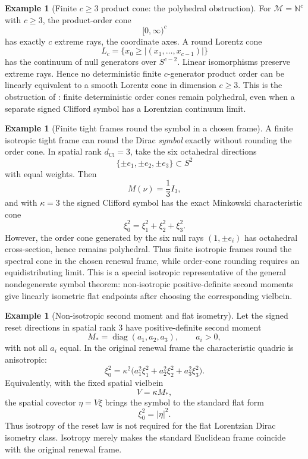 \documentclass[11pt]{article}
\theoremstyle{definition}
\newtheorem{example}[theorem]{Example}
\theoremstyle{remark}
\newcommand{\N}{\mathbb{N}}
\newcommand{\M}{\mathcal{M}}
\newcommand{\dCl}{d_{\mathrm{Cl}}}
\begin{document}
\begin{example}[Finite \(c\ge3\) product cone: the polyhedral obstruction]
\label{ex:finite-cone}
For \(\M=\N^{c}\) with \(c\ge3\), the product-order cone
\[
  [0,\infty)^c
\]
has exactly \(c\) extreme rays, the coordinate axes.  A round Lorentz cone
\[
  L_c=\{x_0\ge |(x_1,\dots,x_{c-1})|\}
\]
has the continuum of null generators over \(S^{c-2}\).  Linear isomorphisms
preserve extreme rays.  Hence no deterministic finite \(c\)-generator product
order can be linearly equivalent to a smooth Lorentz cone in dimension
\(c\ge3\).  This is the obstruction of : finite
deterministic order cones remain polyhedral, even when a separate signed
Clifford symbol has a Lorentzian continuum limit.
\end{example}

\begin{example}[Finite tight frames round the symbol in a chosen frame]
\label{ex:finite-frame-symbol}
A finite isotropic tight frame can round the Dirac \emph{symbol} exactly without
rounding the order cone.  In spatial rank \(\dCl=3\), take the six octahedral
directions
\[
  \{\pm e_1,\pm e_2,\pm e_3\}\subset S^2
\]
with equal weights.  Then
\[
  M(\nu)=\frac13 I_3 ,
\]
and with \(\kappa=3\) the signed Clifford symbol has the exact Minkowski
characteristic cone
\[
  \xi_0^2=\xi_1^2+\xi_2^2+\xi_3^2 .
\]
However, the order cone generated by the six null rays \((1,\pm e_i)\) has
octahedral cross-section, hence remains polyhedral.  Thus finite isotropic
frames round the spectral cone in the chosen renewal frame, while order-cone
rounding requires an equidistributing limit.  This is a special isotropic
representative of the general nondegenerate symbol theorem: non-isotropic
positive-definite second moments give linearly isometric flat endpoints after
choosing the corresponding vielbein.
\end{example}

\begin{example}[Non-isotropic second moment and flat isometry]
\label{ex:anisotropic-frame-equivalence}
Let the signed reset directions in spatial rank \(3\) have positive-definite
second moment
\[
  M_*=\operatorname{diag}(a_1,a_2,a_3),
  \qquad a_i>0,
\]
with not all \(a_i\) equal.  In the original renewal frame the characteristic
quadric is anisotropic:
\[
  \xi_0^2=\kappa^2\bigl(a_1^2\xi_1^2+a_2^2\xi_2^2+a_3^2\xi_3^2\bigr).
\]
Equivalently, with the fixed spatial vielbein
\[
  V=\kappa M_*,
\]
the spatial covector \(\eta=V\xi\) brings the symbol to the standard flat form
\[
  \xi_0^2=|\eta|^2 .
\]
Thus isotropy of the reset law is not required for the flat Lorentzian Dirac
isometry class.  Isotropy merely makes the standard Euclidean frame coincide
with the original renewal frame.
\end{example}
\end{document}
